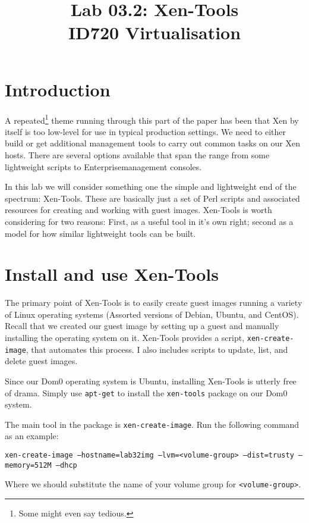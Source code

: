 \documentclass{article}
\begin{document}
\title{Lab 03.2: Xen-Tools\\ ID720 Virtualisation}
\date{}
\maketitle

\section*{Introduction}
A repeated\footnote{Some might even say tedious.} theme running through this part of the paper has been that Xen
by itself is too low-level for use in typical production settings. We need to either build or get additional management 
tools to carry out common tasks on our Xen hosts. There are several options available that span the range from some 
lightweight scripts to Enterprise\texttrademark management consoles.

In this lab we will consider something one the simple and lightweight end of the spectrum: Xen-Tools. These are basically just a set of Perl scripts and associated resources for creating and working with guest images. Xen-Tools is worth considering for two reasons: First, as a useful tool in it's own right; second as a model for how similar lightweight tools can be built.

\section{Install and use Xen-Tools}
The primary point of Xen-Tools is to easily create guest images running a variety of Linux operating
systems (Assorted versions of Debian, Ubuntu, and CentOS). Recall that we created our guest image 
by setting up a guest and manually installing the operating system on it. Xen-Tools provides a script,
\texttt{xen-create-image}, that automates this process. I also includes scripts to update, list, and delete 
guest images.

Since our Dom0 operating system is Ubuntu, installing Xen-Tools is utterly free of drama. Simply use 
\texttt{apt-get} to install the \texttt{xen-tools} package on our Dom0 system.

The main tool in the package is \texttt{xen-create-image}. Run the following command as an example:

\texttt{xen-create-image  --hostname=lab32img --lvm=<volume-group> --dist=trusty --memory=512M --dhcp}

Where we should substitute the name of your volume group for \texttt{<volume-group>}.
\end{document}
